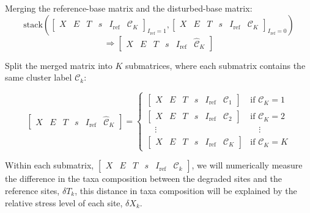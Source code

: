 Merging the reference-base matrix and the disturbed-base matrix:
\[
\text{stack}\left(
\left[
\begin{array}{cccccc}
X & E & T & s & I_{\text{ref}} & \mathcal{C}_K
\end{array}
\right]_{I_{\text{ref}} = 1}
,
\left[
\begin{array}{cccccc}
X & E & T & s & I_{\text{ref}} & \mathcal{C}_K
\end{array}
\right]_{I_{\text{ref}} = 0}
\right)
\]
\[
\Rightarrow
\left[
\begin{array}{cccccc}
X & E & T & s & I_{\text{ref}} & \mathcal{\hat C}_K
\end{array}
\right]
\]

Split the merged matrix into \(K\) submatrices, where each submatrix contains the same cluster label \(\mathcal{C}_k\):

\[
\left[
\begin{array}{cccccc}
X & E & T & s & I_{\text{ref}} & \mathcal{\hat C}_K
\end{array}
\right]
=
\left\{
\begin{array}{ll}
\left[
\begin{array}{cccccc}
X & E & T & s & I_{\text{ref}} & \mathcal{C}_1
\end{array}
\right] & \text{if } \mathcal{C}_K = 1 \\[1.2em]
\left[
\begin{array}{cccccc}
X & E & T & s & I_{\text{ref}} & \mathcal{C}_2
\end{array}
\right] & \text{if } \mathcal{C}_K = 2 \\[0.8em]
\quad\vdots & \quad
\vdots \\[0.8em]
\left[
\begin{array}{cccccc}
X & E & T & s & I_{\text{ref}} & \mathcal{C}_K
\end{array}
\right] & \text{if } \mathcal{C}_K = K
\end{array}
\right.
\]

Within each submatrix,
$
\left[
\begin{array}{cccccc}
X & E & T & s & I_{\text{ref}} & {\mathcal{C}_k}
\end{array}
\right]
$, we will numerically measure the difference in the taxa composition 
between the degraded sites and the reference sites,
$\delta T_k$, this distance in taxa composition will be explained by the 
relative stress level of each site, \(\delta X_k\).

